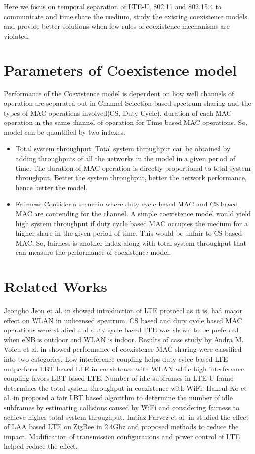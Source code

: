 \documentclass[a4paper]{article}
\begin{document}
Here we focus on temporal separation of {LTE-U}, 802.11 and 802.15.4 to communicate and time share the medium, study the existing coexistence models and provide better solutions when few rules of coexistence mechanisms are violated.

\section{Parameters of Coexistence model}
Performance of the Coexistence model is dependent on how well channels of operation are separated out in Channel Selection based spectrum sharing and the types of {MAC} operations involved(CS, Duty Cycle), duration of each {MAC} operation in the same channel of operation for Time based MAC operations.
So, model can be quantified by two indexes.
 \begin{itemize}
 \item
Total system throughput: Total system throughput can be obtained by adding throughputs of all the networks in the model in a given period of time. The duration of {MAC} operation is directly proportional to total system throughput. Better the system throughput, better the network performance, hence better the model.
\item
Fairness: Consider a scenario where {duty cycle based MAC} and {CS based MAC} are contending for the channel. A simple coexistence model would yield high system throughput if {duty cycle based MAC} occupies the medium for a higher share in the given period of time. This would be unfair to {CS based MAC}. So, fairness is another index along with total system throughput that can measure the performance of coexistence model.
\end{itemize}
	\section{Related Works}
	\paragraph{}
	Jeongho Jeon et al. in \cite{7063521} showed introduction of {LTE} protocol as it is, had major effect on {WLAN} in unlicensed spectrum. {CS} based and duty cycle based {MAC} operations were studied and duty cycle based {LTE} was shown to be preferred when {eNB} is outdoor and {WLAN} is indoor.
	Results of case study by Andra M. Voicu et al. in \cite{7583669} showed performance of coexistence {MAC} sharing were classified into two categories. Low interference coupling helps duty cylce based {LTE} outperform {LBT} based {LTE} in coexistence with {WLAN} while high interference coupling favors {LBT} based {LTE}.
	Number of idle subframes in {LTE-U} frame determines the total system throughput in coexistence with {WiFi}. Haneul Ko et al. in \cite{7419263} proposed a fair {LBT} based algorithm to determine the number of idle subframes by estimating collisions caused by {WiFi} and considering fairness to achieve higher total system throughput. Imtiaz Parvez et al. in \cite{7506714} studied the effect of {LAA based LTE} on {ZigBee} in {2.4Ghz} and proposed methods to reduce the impact. Modification of transmission configurations and power control of {LTE} helped reduce the effect.
\end{document}
